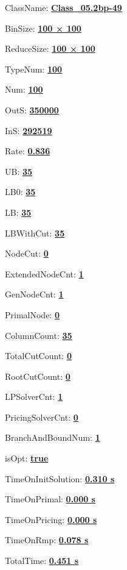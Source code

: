 \documentclass[11pt]{article}
\begin{document}
\pagestyle{empty}


ClassName: \underline{\textbf{Class_05.2bp-49}}
\par
BinSize: \underline{\textbf{100 × 100}}
\par
ReduceSize: \underline{\textbf{100 × 100}}
\par
TypeNum: \underline{\textbf{100}}
\par
Num: \underline{\textbf{100}}
\par
OutS: \underline{\textbf{350000}}
\par
InS: \underline{\textbf{292519}}
\par
Rate: \underline{\textbf{0.836}}
\par
UB: \underline{\textbf{35}}
\par
LB0: \underline{\textbf{35}}
\par
LB: \underline{\textbf{35}}
\par
LBWithCut: \underline{\textbf{35}}
\par
NodeCut: \underline{\textbf{0}}
\par
ExtendedNodeCnt: \underline{\textbf{1}}
\par
GenNodeCnt: \underline{\textbf{1}}
\par
PrimalNode: \underline{\textbf{0}}
\par
ColumnCount: \underline{\textbf{35}}
\par
TotalCutCount: \underline{\textbf{0}}
\par
RootCutCount: \underline{\textbf{0}}
\par
LPSolverCnt: \underline{\textbf{1}}
\par
PricingSolverCnt: \underline{\textbf{0}}
\par
BranchAndBoundNum: \underline{\textbf{1}}
\par
isOpt: \underline{\textbf{true}}
\par
TimeOnInitSolution: \underline{\textbf{0.310 s}}
\par
TimeOnPrimal: \underline{\textbf{0.000 s}}
\par
TimeOnPricing: \underline{\textbf{0.000 s}}
\par
TimeOnRmp: \underline{\textbf{0.078 s}}
\par
TotalTime: \underline{\textbf{0.451 s}}
\par
\newpage


\end{document}

